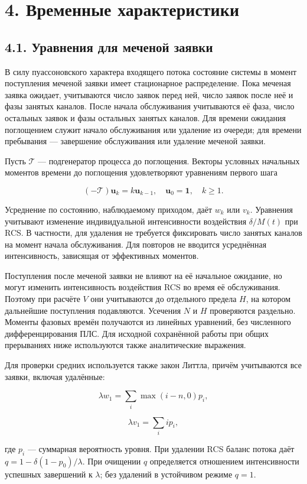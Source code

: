 \section*{4. Временные характеристики}
\subsection*{4.1. Уравнения для меченой заявки}
В силу пуассоновского характера входящего потока состояние системы в момент поступления меченой заявки имеет стационарное распределение. Пока меченая заявка ожидает, учитываются число заявок перед ней, число заявок после неё и фазы занятых каналов. После начала обслуживания учитываются её фаза, число остальных заявок и фазы остальных занятых каналов. Для времени ожидания поглощением служит начало обслуживания или удаление из очереди; для времени пребывания --- завершение обслуживания или удаление меченой заявки.

Пусть \(\mathcal T\) --- подгенератор процесса до поглощения. Векторы условных начальных моментов времени до поглощения удовлетворяют уравнениям первого шага


\[(-\mathcal T)\boldsymbol u_k=k\boldsymbol u_{k-1},\quad
\boldsymbol u_0=\mathbf1,\quad k\ge1.\]


Усреднение по состоянию, наблюдаемому приходом, даёт \(w_k\) или \(v_k\). Уравнения учитывают изменение индивидуальной интенсивности воздействия \(\delta/M(t)\) при RCS. В частности, для удаления не требуется фиксировать число занятых каналов на момент начала обслуживания. Для повторов не вводится усреднённая интенсивность, зависящая от эффективных моментов.

Поступления после меченой заявки не влияют на её начальное ожидание, но могут изменить интенсивность воздействия RCS во время её обслуживания. Поэтому при расчёте \(V\) они учитываются до отдельного предела \(H\), на котором дальнейшие поступления подавляются. Усечения \(N\) и \(H\) проверяются раздельно. Моменты фазовых времён получаются из линейных уравнений, без численного дифференцирования ПЛС. Для исходной сохранённой работы при общих прерываниях ниже используются также аналитические выражения.

Для проверки средних используется также закон Литтла, причём учитываются все заявки, включая удалённые:


\[\lambda w_1=\sum_i\max(i-n,0)p_i,\]

\[\lambda v_1=\sum_i i p_i,\]


где \(p_i\) --- суммарная вероятность уровня. При удалении RCS баланс потока даёт \(q=1-\delta(1-p_0)/\lambda\). При очищении \(q\) определяется отношением интенсивности успешных завершений к \(\lambda\); без удалений в устойчивом режиме \(q=1\).

